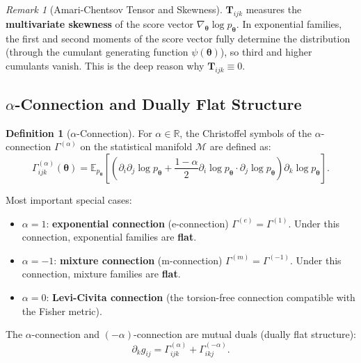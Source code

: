 \documentclass[12pt,a4paper]{article}
\theoremstyle{plain}
\theoremstyle{definition}
\newtheorem{definition}[theorem]{Definition}
\theoremstyle{remark}
\newtheorem{remark}[theorem]{Remark}
\newcommand{\R}{\mathbb{R}}
\newcommand{\E}{\mathbb{E}}
\newcommand{\MM}{\mathcal{M}}
\newcommand{\ACT}{\mathbf{T}}    %
\begin{document}
\begin{remark}[Amari-Chentsov Tensor and Skewness]
$\ACT_{ijk}$ measures the \textbf{multivariate skewness} of the score vector $\nabla_{\bm{\theta}} \log p_{\bm{\theta}}$. In exponential families, the first and second moments of the score vector fully determine the distribution (through the cumulant generating function $\psi(\bm{\theta})$), so third and higher cumulants vanish. This is the deep reason why $\ACT_{ijk} \equiv 0$.
\end{remark}

\subsection{$\alpha$-Connection and Dually Flat Structure}

\begin{definition}[$\alpha$-Connection]
\label{def:alpha_connection}
For $\alpha \in \R$, the Christoffel symbols of the $\alpha$-connection $\Gamma^{(\alpha)}$ on the statistical manifold $\MM$ are defined as:
\begin{equation}\label{eq:alpha_connection}
    \Gamma^{(\alpha)}_{ijk}(\bm{\theta}) = \E_{p_{\bm{\theta}}}\left[
        \left(\partial_i \partial_j \log p_{\bm{\theta}} + \frac{1-\alpha}{2} \partial_i \log p_{\bm{\theta}} \cdot \partial_j \log p_{\bm{\theta}}\right)
        \partial_k \log p_{\bm{\theta}}
    \right].
\end{equation}

Most important special cases:
\begin{itemize}
    \item $\alpha = 1$: \textbf{exponential connection} (e-connection) $\Gamma^{(e)} = \Gamma^{(1)}$. Under this connection, exponential families are \textbf{flat}.
    \item $\alpha = -1$: \textbf{mixture connection} (m-connection) $\Gamma^{(m)} = \Gamma^{(-1)}$. Under this connection, mixture families are \textbf{flat}.
    \item $\alpha = 0$: \textbf{Levi-Civita connection} (the torsion-free connection compatible with the Fisher metric).
\end{itemize}

The $\alpha$-connection and $(-\alpha)$-connection are mutual duals (dually flat structure):
\begin{equation}\label{eq:duality}
    \partial_k g_{ij} = \Gamma^{(\alpha)}_{ijk} + \Gamma^{(-\alpha)}_{ikj}.
\end{equation}
\end{definition}
\end{document}
